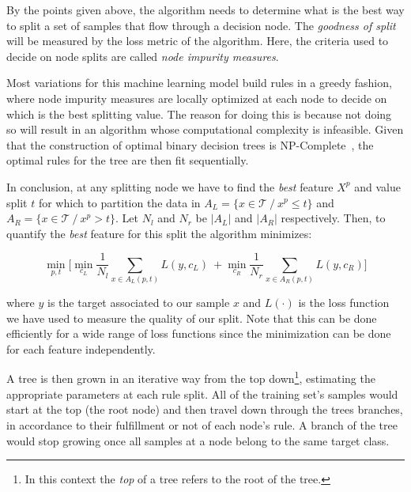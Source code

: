 By the points given above, the algorithm needs to determine what is the best way to split a set of samples that flow through a decision node. The \textit{goodness of split} will be measured by the loss metric of the algorithm. Here, the criteria used to decide on node splits are called \textit{node impurity measures}.

Most variations for this machine learning model build rules in a greedy fashion, where node impurity measures are locally optimized at each node to decide on which is the best splitting value. The reason for doing this is because not doing so will result in an algorithm whose computational complexity is infeasible. Given that the construction of optimal binary decision trees is NP-Complete~\cite{decisionTreesNP}, the optimal rules for the tree are then fit sequentially.

In conclusion, at any splitting node we have to find the \textit{best} feature $X^p$ and value split $t$ for which to partition the data in
$A_L = \{x \in \mathcal{T} \ / \ x^p \leq t \} $ and $A_R = \{x \in \mathcal{T}\ / \ x^p> t \} $. Let $N_l$ and $N_r$ be $|A_L|$ and $|A_R|$ respectively. Then, to quantify the \textit{best} feature for this split the algorithm minimizes:


\begin{equation}
\min_{p,t} \big[ \min_{c_L }  \frac{1}{N_l}\sum_{x \in A_L(p,t) } L(y,c_L)    \ +  \min_{c_R}  \frac{1}{N_r}\sum_{x \in A_R(p,t) } L(y,c_R) \big]
\end{equation}\label{eq:decisionTreeGreedyOptimization}

where $y$ is the target associated to our sample $x$ and $L(\cdot)$ is the loss function we have used to measure the quality of our split. Note that this can be done efficiently for a wide range of loss functions since the minimization can be done for each feature independently.

A tree is then grown in an iterative way from the top down\footnote{In this context the \textit{top} of a tree refers to the root of the tree.}, estimating the appropriate parameters at each rule split. All of the training set's samples would start at the top (the root node) and then travel down through the trees branches, in accordance to their fulfillment or not of each node's rule. A branch of the tree would stop growing once all samples at a node belong to the same target class.

